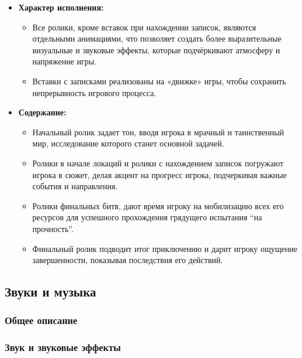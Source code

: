 \documentclass{article}
\begin{document}
\begin{itemize}
\item \textbf{Характер исполнения:}
    \begin{itemize}
        \item \textbf{}Все ролики, кроме вставок при нахождении записок, являются отдельными анимациями, что позволяет создать более выразительные визуальные и звуковые эффекты, которые подчёркивают атмосферу и напряжение игры.
        \item \textbf{}Вставки с записками реализованы на «движке» игры, чтобы сохранить непрерывность игрового процесса.
    \end{itemize}
\item \textbf{Содержание:}
    \begin{itemize}
        \item \textbf{}Начальный ролик задает тон, вводя игрока в мрачный и таинственный мир, исследование которого станет основной задачей. 
        \item \textbf{}Ролики в начале локаций и ролики с нахождением записок погружают игрока в сюжет, делая акцент на прогресс игрока, подчеркивая важные события и направления.
        \item \textbf{}Ролики финальных битв, дают время игроку на мобилизацию всех его ресурсов для успешного прохождения грядущего испытания “на прочность”.

        \item \textbf{}Финальный ролик подводит итог приключению и дарит игроку ощущение завершенности, показывая последствия его действий.
    \end{itemize}
\end{itemize}
\subsection{Звуки и музыка}

\subsubsection{Общее описание}

\subsubsection{Звук и звуковые эффекты}
\end{document}
